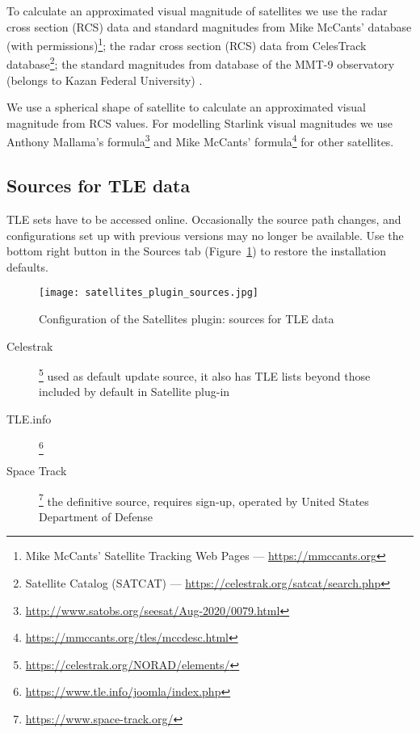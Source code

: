 To calculate an approximated visual magnitude of satellites we use the 
radar cross section (RCS) data and standard magnitudes from Mike McCants' 
database (with permissions)\footnote{Mike McCants' Satellite Tracking 
Web Pages --- \url{https://mmccants.org}}; the radar cross section (RCS) 
data from CelesTrack database\footnote{Satellite Catalog (SATCAT) --- 
\url{https://celestrak.org/satcat/search.php}}; the standard magnitudes 
from database of the MMT-9 observatory (belongs to Kazan 
Federal University) \citep{MMT-9:Karpov, MMT-9:Beskin}.

We use a spherical shape of satellite to calculate an approximated visual 
magnitude from RCS values. For modelling Starlink visual magnitudes we use 
Anthony Mallama's formula\footnote{\url{http://www.satobs.org/seesat/Aug-2020/0079.html}} 
\citep{mallama2020starlink} and Mike McCants' formula\footnote{\url{https://mmccants.org/tles/mccdesc.html}} 
for other satellites.

\subsection{Sources for TLE data}

TLE sets have to be accessed online. Occasionally the source path changes, and configurations set up with previous versions may no longer be available. 
Use the bottom right button in the Sources tab (Figure~\ref{fig:plugins:Satellites:Configuration:Sources}) to restore the installation defaults. 

\begin{figure}[tbp]
	\centering\texttt{[image: satellites\_plugin\_sources.jpg]}
	\caption{Configuration of the Satellites plugin: sources for TLE data}
	\label{fig:plugins:Satellites:Configuration:Sources}
\end{figure}

\begin{description}
\item[Celestrak]\footnote{\url{https://celestrak.org/NORAD/elements/}} used as default update source, it also has TLE lists
  beyond those included by default in Satellite plug-in
\item[TLE.info]\footnote{\url{https://www.tle.info/joomla/index.php}}
\item[Space Track]\footnote{\url{https://www.space-track.org/}} the definitive source, requires sign-up, operated by
  United States Department of Defense
\end{description}

